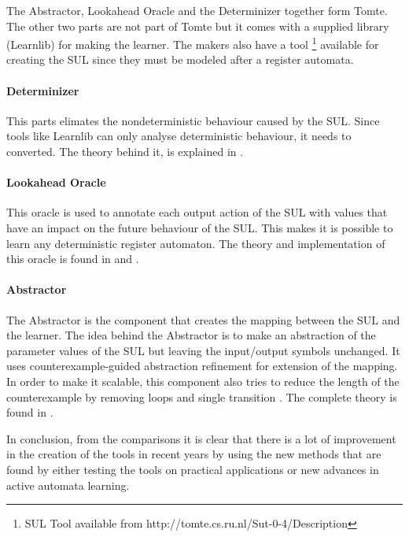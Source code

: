 \documentclass[multi,crop=false,class=article]{standalone}
\begin{document}
The Abstractor, Lookahead Oracle and the Determinizer together form Tomte. The 
other two parts are not part of Tomte but it comes with a supplied library 
(Learnlib) for making the learner.
The makers also have a tool \footnote{SUL Tool available from 
http://tomte.cs.ru.nl/Sut-0-4/Description} available for creating the SUL since 
they must be modeled after a register automata.
 
\paragraph{Determinizer}
This parts elimates the nondeterministic behaviour caused by the SUL. Since 
tools like Learnlib can only analyse deterministic behaviour, it needs to 
converted. The theory behind it, is explained in \cite{Aarts2015}.

\paragraph{Lookahead Oracle}
This oracle is used to annotate each output action of the SUL with values that 
have an impact on the future behaviour of the SUL. This makes it is possible to 
learn any deterministic register automaton. The theory and implementation of 
this oracle is found in \cite{Aarts2014} and \cite{tomte14}.

\paragraph{Abstractor}
The Abstractor is the component that creates the mapping between the SUL and 
the learner. The idea behind the Abstractor is to make an abstraction of the 
parameter values of the SUL but leaving the input/output symbols unchanged. It 
uses counterexample-guided abstraction refinement\cite{tomte14} for extension 
of the mapping. In order to make it scalable, this component also tries to 
reduce the length of the counterexample by removing loops and single 
transition \cite{Koopman2014}. The complete theory is found in \cite{tomte14}.





In conclusion, from the comparisons it is clear that there is a lot of 
improvement in the creation of the tools in recent years by using the new 
methods that are found by either testing the tools on practical applications or 
new advances in active automata learning.
\end{document}
